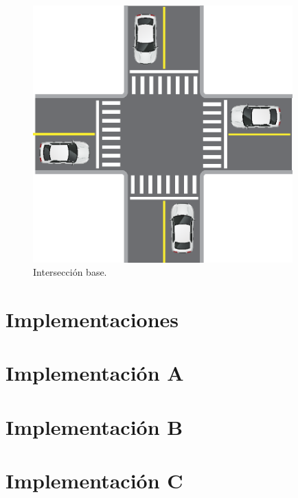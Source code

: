 \begin{figure}
	\centering
	\includegraphics[width=10cm]{imagenes/interseccion-base.eps}
	\caption{Intersección base.}
	\label{fig:interseccion-base}
\end{figure}

\section{Implementaciones}

\section{Implementación A}
\section{Implementación B}
\section{Implementación C}
